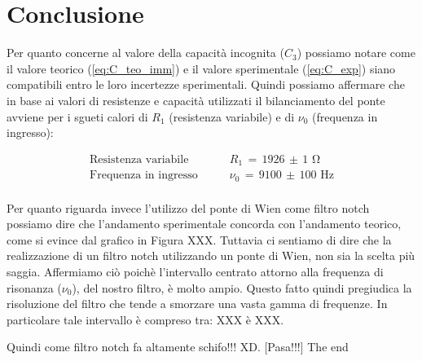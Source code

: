 \section*{Conclusione}

Per quanto concerne al valore della capacità incognita ($C_3$) possiamo notare come il valore teorico (\ref{eq:C_teo_imm}) e il valore sperimentale (\ref{eq:C_exp}) siano compatibili entro le loro incertezze sperimentali. Quindi possiamo affermare che in base ai valori di resistenze e capacità utilizzati il bilanciamento del ponte avviene per i sgueti calori di $R_1$ (resistenza variabile) e di $\nu_0$ (frequenza in ingresso):

\begin{align*}
	\text{Resistenza variabile}& \qquad R_1 \,=\, 1926 \,\pm\, 1 \,\,\si{\ohm} \\
	\text{Frequenza in ingresso}& \qquad \nu_0 \,=\, 9100 \,\pm\, 100 \,\,\si{\hertz} \\
\end{align*}

Per quanto riguarda invece l'utilizzo del ponte di Wien come filtro notch possiamo dire che l'andamento sperimentale concorda con l'andamento teorico, come si evince dal grafico in Figura XXX. Tuttavia ci sentiamo di dire che la realizzazione di un filtro notch utilizzando un ponte di Wien, non sia la scelta più saggia. Affermiamo ciò poichè l'intervallo centrato attorno alla frequenza di risonanza ($\nu_0$), del nostro filtro, è molto ampio. Questo fatto quindi pregiudica la risoluzione del filtro che tende a smorzare una vasta gamma di frequenze. In particolare tale intervallo è compreso tra: XXX è XXX.
 
Quindi come filtro notch fa altamente schifo!!! XD. [Pasa!!!]
\newline
\newline
The end
